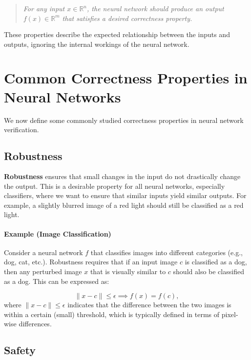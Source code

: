 \begin{quote}
\textit{For any input $x \in \mathbb{R}^{n}$, the neural network should produce an output $f(x) \in \mathbb{R}^{m}$ that satisfies a desired correctness property.}
\end{quote}

These properties describe the expected relationship between the inputs and outputs, ignoring the internal workings of the neural network.

\section{Common Correctness Properties in Neural Networks}

We now define some commonly studied correctness properties in neural network verification.

\subsection{Robustness}

\textbf{Robustness} ensures that small changes in the input do not drastically change the output. This is a desirable property for all neural networks, especially classifiers, where we want to ensure that similar inputs yield similar outputs. For example, a slightly blurred image of a red light should still be classified as a red light.

\paragraph{Example (Image Classification)}
Consider a neural network $f$ that classifies images into different categories (e.g., dog, cat, etc.). Robustness requires that if an input image $c$ is classified as a dog, then any perturbed image $x$ that is visually similar to $c$ should also be classified as a dog. This can be expressed as:

\[
\|x - c\| \leq \epsilon \implies f(x) = f(c), 
\]
where $\|x - c\| \leq \epsilon$ indicates that the difference between the two images is within a certain (small) threshold, which is typically defined in terms of pixel-wise differences.




\subsection{Safety}


